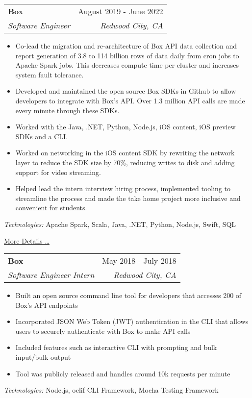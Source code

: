 \documentclass[letterpaper,10pt]{article}
\makeatletter
\newcommand{\resumeItem}[1]{
  \item\small{
    {#1 \vspace{-2pt}}
  }
}
\newcommand{\resumeSubheading}[4]{
  \vspace{-2pt}\item
    \begin{tabular*}{0.97\textwidth}[t]{l@{\extracolsep{\fill}}r}
      \textbf{#1} & #2 \\
      \textit{\small#3} & \textit{\small #4} \\
    \end{tabular*}\vspace{-7pt}
}
\newcommand{\resumeSubSubheading}[2]{
    \item
    \begin{tabular*}{0.97\textwidth}{l@{\extracolsep{\fill}}r}
      \textit{\small#1} & \textit{\small #2} \\
    \end{tabular*}\vspace{-7pt}
}
\newcommand{\resumeSubHeadingListEnd}{\end{itemize}}
\newcommand{\resumeItemListStart}{\begin{itemize}}
\newcommand{\resumeItemListEnd}{\end{itemize}\vspace{-5pt}}
\makeatother
\begin{document}
    \resumeSubheading
      {Box}{August 2019 - June 2022}
      {Software Engineer}{Redwood City, CA}
      \resumeItemListStart
        \resumeItem{Co-lead the migration and re-architecture of Box API data collection and report generation of 3.8 to 114 billion rows of data daily from cron jobs to Apache Spark jobs. This decreases compute time per cluster and increases system fault tolerance.}
        \resumeItem{Developed and maintained the open source Box SDKs in Github to allow developers to integrate with Box's API. Over 1.3 million API calls are made every minute through these SDKs.}
        \resumeItem{Worked with the Java, .NET, Python, Node.js, iOS content, iOS preview SDKs and a CLI.}
        \resumeItem{Worked on networking in the iOS content SDK by rewriting the network layer to reduce the SDK size by 70\%, reducing writes to disk and adding support for video streaming.}
        \resumeItem{Helped lead the intern interview hiring process, implemented tooling to streamline the process and made the take home project more inclusive and convenient for students.}
      \resumeItemListEnd
      \vspace{5pt}
      \emph{Technologies:} Apache Spark, Scala, Java, .NET, Python, Node.js, Swift, SQL

      \href{https://sujaygarlanka.com/experience.html}{\underline{More Details} \ldots}
      

    \resumeSubheading
      {Box}{May 2018 - July 2018}
      {Software Engineer Intern}{Redwood City, CA}
      \resumeItemListStart
        \resumeItem{Built an open source command line tool for developers that accesses 200 of Box’s API endpoints}
        \resumeItem{Incorporated JSON Web Token (JWT) authentication in the CLI that allows users to securely authenticate with Box to make API calls}
        \resumeItem{Included features such as interactive CLI with prompting and bulk input/bulk output}
        \resumeItem{Tool was publicly released and handles around 10k requests per minute}
     \resumeItemListEnd
     \vspace{5pt}
     \emph{Technologies:} Node.js, oclif CLI Framework, Mocha Testing Framework
\end{document}
